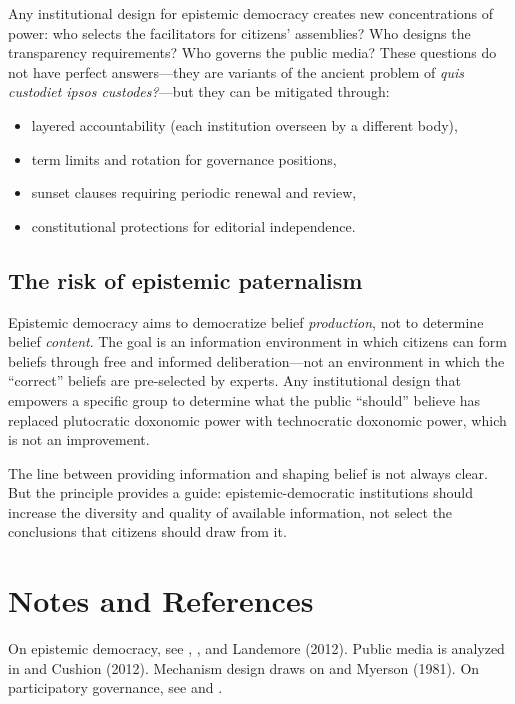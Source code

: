 Any institutional design for epistemic democracy creates new concentrations of power: who selects the facilitators for citizens' assemblies? Who designs the transparency requirements? Who governs the public media?
These questions do not have perfect answers---they are variants of the ancient problem of \emph{quis custodiet ipsos custodes?}---but they can be mitigated through:
\begin{itemize}[nosep]
  \item layered accountability (each institution overseen by a different body),
  \item term limits and rotation for governance positions,
  \item sunset clauses requiring periodic renewal and review,
  \item constitutional protections for editorial independence.
\end{itemize}

\subsection{The risk of epistemic paternalism}

\begin{principle}
\label{prin:anti-paternalism}
Epistemic democracy aims to democratize belief \emph{production}, not to determine belief \emph{content}.
The goal is an information environment in which citizens can form beliefs through free and informed deliberation---not an environment in which the ``correct'' beliefs are pre-selected by experts.
Any institutional design that empowers a specific group to determine what the public ``should'' believe has replaced plutocratic doxonomic power with technocratic doxonomic power, which is not an improvement.
\end{principle}

The line between providing information and shaping belief is not always clear.
But the principle provides a guide: epistemic-democratic institutions should increase the diversity and quality of available information, not select the conclusions that citizens should draw from it.

\section{Notes and References}
\label{sec:ch32-notes}

On epistemic democracy, see \textcite{dewey1927}, \textcite{habermas1962}, and Landemore (2012).
Public media is analyzed in \textcite{mcchesney1999} and Cushion (2012).
Mechanism design draws on \textcite{arrow1963} and Myerson (1981).
On participatory governance, see \textcite{ostrom1990} and \textcite{wright2010}.

